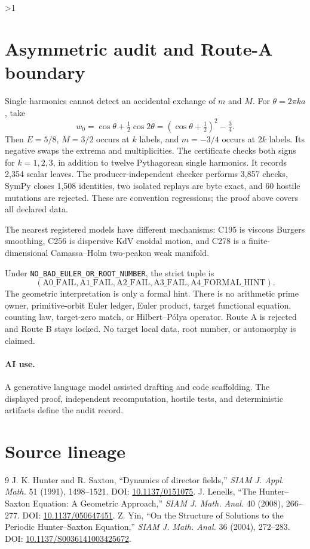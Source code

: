 \documentclass[10pt]{article}
\providecommand{\CRevisionRound}{2}
\begin{document}
\ifnum\CRevisionRound>1
\section{Asymmetric audit and Route-A boundary}
Single harmonics cannot detect an accidental exchange of $m$ and $M$.
For $\theta=2\pi k a$, take
\[
 w_0=\cos\theta+\tfrac12\cos2\theta
     =(\cos\theta+\tfrac12)^2-\tfrac34.
\]
Then $E=5/8$, $M=3/2$ occurs at $k$ labels, and $m=-3/4$ occurs at
$2k$ labels.  Its negative swaps the extrema and multiplicities.  The
certificate checks both signs for $k=1,2,3$, in addition to twelve
Pythagorean single harmonics.  It records 2,354 scalar leaves.  The
producer-independent checker performs 3,857 checks, SymPy closes 1,508
identities, two isolated replays are byte exact, and 60 hostile mutations
are rejected.  These are convention regressions; the proof above covers
all declared data.

The nearest registered models have different mechanisms: C195 is viscous
Burgers smoothing, C256 is dispersive KdV cnoidal motion, and C278 is a
finite-dimensional Camassa--Holm two-peakon weak manifold.

Under \texttt{NO\_BAD\_EULER\_OR\_ROOT\_NUMBER}, the strict tuple is
\[
 (\mathrm{A0\_FAIL},\mathrm{A1\_FAIL},\mathrm{A2\_FAIL},
  \mathrm{A3\_FAIL},\mathrm{A4\_FORMAL\_HINT}).
\]
The geometric interpretation is only a formal hint.  There is no arithmetic
prime owner, primitive-orbit Euler ledger, Euler product, target functional
equation, counting law, target-zero match, or Hilbert--P\'olya operator.
Route A is rejected and Route B stays locked.  No target local data, root
number, or automorphy is claimed.

\paragraph{AI use.}
A generative language model assisted drafting and code scaffolding.  The
displayed proof, independent recomputation, hostile tests, and deterministic
artifacts define the audit record.
\fi

\section*{Source lineage}
\small
\begin{thebibliography}{9}
\setlength{\itemsep}{0pt}
 J. K. Hunter and R. Saxton,
``Dynamics of director fields,'' \emph{SIAM J. Appl. Math.} 51 (1991),
1498--1521. DOI: \href{https://doi.org/10.1137/0151075}{10.1137/0151075}.
 J. Lenells,
``The Hunter--Saxton Equation: A Geometric Approach,''
\emph{SIAM J. Math. Anal.} 40 (2008), 266--277. DOI:
\href{https://doi.org/10.1137/050647451}{10.1137/050647451}.
 Z. Yin,
``On the Structure of Solutions to the Periodic Hunter--Saxton Equation,''
\emph{SIAM J. Math. Anal.} 36 (2004), 272--283. DOI:
\href{https://doi.org/10.1137/S0036141003425672}%
{10.1137/S0036141003425672}.
\end{thebibliography}
\end{document}
